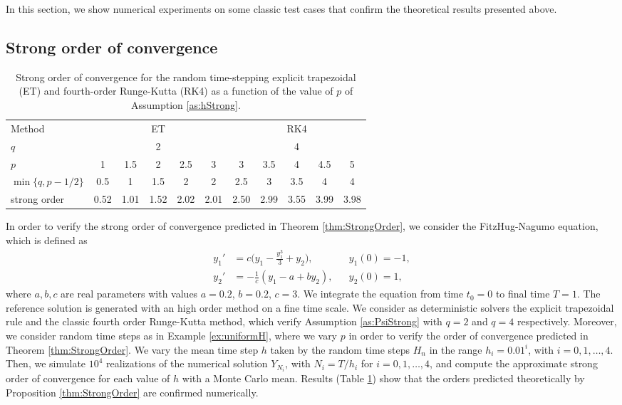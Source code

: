 \documentclass{siamart1116}
\numberwithin{theorem}{section}
\begin{document}
In this section, we show numerical experiments on some classic test cases that confirm the theoretical results presented above. 

\subsection{Strong order of convergence}

\begin{table}[!t]
	\centering
	\begin{tabular}{lcccccccccc}
		\toprule
		Method & \multicolumn{5}{c}{ET} & \multicolumn{5}{c}{RK4} \\ 
		\cmidrule(l{2pt}r{2pt}){2-6} \cmidrule(l{2pt}r{2pt}){7-11} 
		$q$ & \multicolumn{5}{c}{2} & \multicolumn{5}{c}{4} \\
		$p$ & 1 & 1.5 & 2 & 2.5 & 3 & 3 & 3.5 & 4 & 4.5 & 5\\
		$\min\{q, p - 1/2\}$ & 0.5 & 1 & 1.5 & 2 & 2 & 2.5 & 3 & 3.5 & 4 & 4 \\
		strong order & 0.52 & 1.01 & 1.52 & 2.02 & 2.01 & 2.50 & 2.99 & 3.55 & 3.99 & 3.98 \\
		\bottomrule
	\end{tabular}
	\caption{Strong order of convergence for the random time-stepping explicit trapezoidal (ET) and fourth-order Runge-Kutta (RK4) as a function of the value of $p$ of Assumption \ref{as:hStrong}.}
	\label{tab:NumericalResultsStrongOrder}
\end{table}

In order to verify the strong order of convergence predicted in Theorem \ref{thm:StrongOrder}, we consider the FitzHug-Nagumo equation, which is defined as
\begin{equation}\label{eq:FitzNag}
\begin{aligned}
y_1' &= c\big(y_1 - \frac{y_1^3}{3} + y_2\big), && y_1(0) = -1, \\
y_2' &= -\frac{1}{c}(y_1 - a + by_2), && y_2(0) = 1,
\end{aligned}
\end{equation}
where $a, b, c$ are real parameters with values $a = 0.2$, $b = 0.2$, $c = 3$. We integrate the equation from time $t_0 = 0$ to final time $T = 1$. The reference solution is generated with an high order method on a fine time scale. We consider as deterministic solvers the explicit trapezoidal rule and the classic fourth order Runge-Kutta method, which verify Assumption \ref{as:PsiStrong} with $q = 2$ and $q = 4$ respectively. Moreover, we consider random time steps as in Example \ref{ex:uniformH}, where we vary $p$ in order to verify the order of convergence predicted in Theorem \ref{thm:StrongOrder}. We vary the mean time step $h$ taken by the random time steps $H_n$ in the range $h_i = 0.01^{i}$, with $i = 0, 1, \ldots, 4$. Then, we simulate $10^4$ realizations of the numerical solution $Y_{N_i}$, with $N_i = T / h_i$ for $i = 0, 1, \ldots, 4$, and compute the approximate strong order of convergence for each value of $h$ with a Monte Carlo mean. Results (Table \ref{tab:NumericalResultsStrongOrder}) show that the orders predicted theoretically by Proposition \ref{thm:StrongOrder} are confirmed numerically. 
\end{document}
